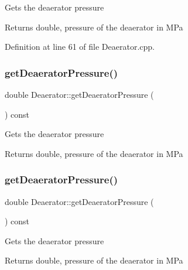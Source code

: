 Gets the deaerator pressure \begin{DoxyReturn}{Returns}
double, pressure of the deaerator in M\+Pa 
\end{DoxyReturn}


Definition at line 61 of file Deaerator.\+cpp.

\mbox{\label{class_deaerator_ac16cacdeef74e45f951fe992bac4e9e3}} 
\subsubsection{\texorpdfstring{get\+Deaerator\+Pressure()}{getDeaeratorPressure()}\hspace{0.1cm}{\footnotesize\ttfamily [2/3]}}
{\footnotesize\ttfamily double Deaerator\+::get\+Deaerator\+Pressure (\begin{DoxyParamCaption}{ }\end{DoxyParamCaption}) const}

Gets the deaerator pressure \begin{DoxyReturn}{Returns}
double, pressure of the deaerator in M\+Pa 
\end{DoxyReturn}
\mbox{\label{class_deaerator_ac16cacdeef74e45f951fe992bac4e9e3}} 
\subsubsection{\texorpdfstring{get\+Deaerator\+Pressure()}{getDeaeratorPressure()}\hspace{0.1cm}{\footnotesize\ttfamily [3/3]}}
{\footnotesize\ttfamily double Deaerator\+::get\+Deaerator\+Pressure (\begin{DoxyParamCaption}{ }\end{DoxyParamCaption}) const}

Gets the deaerator pressure \begin{DoxyReturn}{Returns}
double, pressure of the deaerator in M\+Pa 
\end{DoxyReturn}
\mbox{\label{class_deaerator_ae1524e8b406c3d5c2823ae4e6bafe389}} 
